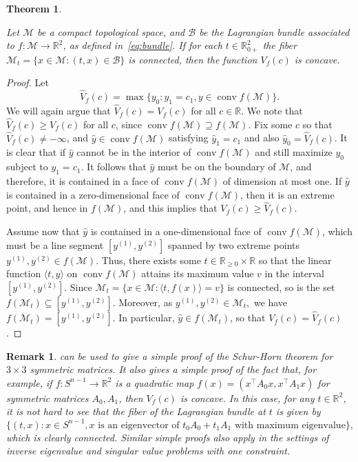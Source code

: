 \documentclass{article}
\numberwithin{equation}{section}
\newcommand{\cB}{\mathcal{B}}
\newcommand{\R}{\mathbb{R}}
\DeclareMathOperator*{\conv}{conv}
\newtheorem{theorem}{Theorem}[section]
\newtheorem{remark}{Remark}
\newcommand{\Rplus}{\R_{0+}}
\newcommand{\cM}{{\mathcal{M}}}
\renewcommand{\cB}{\mathcal{B}}
\begin{document}
\begin{theorem}
\label{thm:connected_fibers}

    Let $\cM$ be a compact topological space, and $\cB$ be the Lagrangian bundle associated to $f : \cM \rightarrow \R^2$, as defined in~\eqref{eq:bundle}. If for each $t \in \Rplus^{2}$ the fiber 
    $\cM_t = \{x \in \cM : (t,x) \in \cB\}$ is connected, then the function $V_f(c)$ is concave.
\end{theorem}
\begin{proof}
Let
\[
    \widehat{V}_f(c) = \max \{ y_0 : y_1 = c_1, y \in \conv f(\cM)\}.
\]
We will again argue that $\widehat V_f(c) = V_f(c)$ for all $c \in \R$. We note that $\widehat V_f(c) \ge V_f(c)$ for all $c$, since $\conv f(\cM) \supseteq f(\cM)$.
Fix some $c$ so that $\widehat V_f(c) \neq -\infty$, and $\hat{y} \in \conv f(\cM)$ satisfying $\hat{y}_1 = c_1$ and also $\hat{y}_0 = \widehat V_f(c)$.
It is clear that if $\hat{y}$ cannot be in the interior of $\conv f(\cM)$ and still maximize $y_0$ subject to $y_1 = c_1$. It follows that $\hat y$ must be on the boundary of $\cM$, and therefore, it is contained in a face of $\conv f(\cM)$ of dimension at most one. If $\hat y$ is contained in a zero-dimensional face of $\conv f(\cM)$, then it is an extreme point, and hence in $f(\cM)$, and this implies that $V_f(c) \ge \widehat V_f(c)$. 

Assume now that $\hat{y}$ is contained in a one-dimensional face of $\conv f(\cM)$, which must be a line segment $[y^{(1)}, y^{(2)}]$ spanned by two extreme points $y^{(1)}, y^{(2)} \in f(\cM)$.
Thus, there exists some $t \in \R_{\ge 0} \times \R$ so that the linear function $\langle t, y\rangle$ on $\conv f(\cM)$ attains its maximum value $v$ in the interval $[y^{(1)}, y^{(2)}]$. 
Since $\cM_t = \{x \in \cM : \langle t, f(x)\rangle = v \}$ is connected, so is the set $f(\cM_t) \subseteq [y^{(1)}, y^{(2)}].$
Moreover, as $y^{(1)}, y^{(2)} \in \cM_t ,$ we have $f(\cM_t) = [y^{(1)}, y^{(2)}].$
In particular, $\hat{y} \in f(\cM_t)$, so that $V_f(c) = \widehat V_f(c)$.
\end{proof}

\begin{remark}
 can be used to give a simple proof of the Schur-Horn theorem for $3\times 3$ symmetric matrices.
It also gives a simple proof of the fact that, for example, if $f : S^{n-1} \rightarrow \R^2$ is a quadratic map $f(x) = (x^{\intercal}A_0x, x^{\intercal}A_1x)$ for symmetric matrices $A_0, A_1$, then $V_f(c)$ is concave. In this case, for any $t \in \R^2$, it is not hard to see that the fiber of the Lagrangian bundle at $t$ is given by 
\[
\{(t, x) : x \in S^{n-1}, x \text{ is an eigenvector of }t_0A_0 + t_1A_1 \text{ with maximum eigenvalue}\},
\]
which is clearly connected. Similar simple proofs also apply in the settings of inverse eigenvalue and singular value problems with one constraint.
\end{remark}
\end{document}
